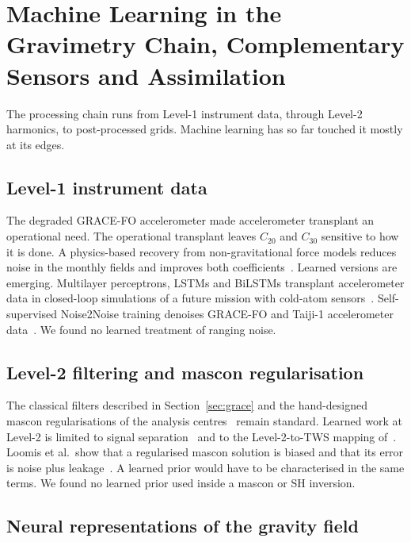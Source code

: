 \section{Machine Learning in the Gravimetry Chain, Complementary Sensors and Assimilation}
\label{sec:geodetic}

The processing chain runs from Level-1 instrument data, through Level-2 harmonics, to post-processed grids. Machine learning has so far touched it mostly at its edges.

\subsection{Level-1 instrument data}

The degraded GRACE-FO accelerometer made accelerometer transplant an operational need. The operational transplant leaves $C_{20}$ and $C_{30}$ sensitive to how it is done. A physics-based recovery from non-gravitational force models reduces noise in the monthly fields and improves both coefficients~\cite{behzadpour2021acc_recovery}. Learned versions are emerging. Multilayer perceptrons, LSTMs and BiLSTMs transplant accelerometer data in closed-loop simulations of a future mission with cold-atom sensors~\cite{romeshkani2025ml_transplant}. Self-supervised Noise2Noise training denoises GRACE-FO and Taiji-1 accelerometer data~\cite{yang2023noise2noise_acc}. We found no learned treatment of ranging noise.

\subsection{Level-2 filtering and mascon regularisation}

The classical filters described in Section~\ref{sec:grace} and the hand-designed mascon regularisations of the analysis centres~\cite{wiese2016leakage,loomis2019regularization} remain standard. Learned work at Level-2 is limited to signal separation~\cite{hellerkaikov2023signal} and to the Level-2-to-TWS mapping of~\cite{chen2025efficient}. Loomis et al.\ show that a regularised mascon solution is biased and that its error is noise plus leakage~\cite{loomis2019regularization}. A learned prior would have to be characterised in the same terms. We found no learned prior used inside a mascon or SH inversion.

\subsection{Neural representations of the gravity field}

